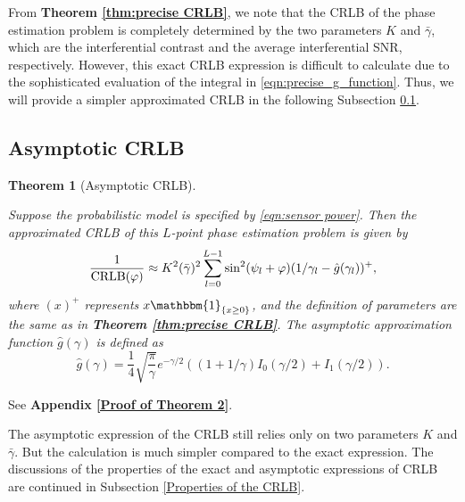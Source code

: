 \documentclass[journal,twocolumn]{IEEEtran}
\newtheorem{theorem}{\bf Theorem}
\theoremstyle{nonumberplain}
\begin{document}
    From \textbf{Theorem \ref{thm:precise CRLB}}, we note that the CRLB of the phase estimation problem is completely determined by the two parameters $K$ and $\bar{\gamma}$, which are the interferential contrast and the average interferential SNR, respectively. 
    However, this exact CRLB expression is difficult to calculate due to the sophisticated evaluation of the integral in \eqref{eqn:precise_g_function}.
    Thus, we will provide a simpler approximated CRLB in the following Subsection \ref{Asymptotic CRLB}.
    
\subsection{Asymptotic CRLB}    \label{Asymptotic CRLB}
    \begin{theorem}[Asymptotic CRLB] \label{thm:asymptotic CRLB} \mbox{}\par
        Suppose the probabilistic model is specified by \eqref{eqn:sensor power}. Then the approximated CRLB of this $L$-point phase estimation problem is given by 
        \begin{equation}
            \frac{1}{{\rm CRLB}(\varphi)}\approx K^2(\bar{\gamma})^2 \sum_{l=0}^{L-1}\sin^2(\psi_l+\varphi)(1/\gamma_l-\hat{g}(\gamma_l))^{+},
            \label{eqn:asymptotic CRLB}
        \end{equation}
        where $(x)^{+}$ represents ${x{\mathbbm{1}}_{\{x\geq 0\}}}$, and the definition of parameters are the same as in {\bf Theorem \ref{thm:precise CRLB}}. The asymptotic approximation function $\hat{g}(\gamma)$ is defined as 
        \begin{equation}
            \hat{g}(\gamma) = \frac{1}{4} \sqrt{\frac{\pi}{\gamma}}e^{-\gamma/2}\left((1+1/\gamma)I_0(\gamma/2) + I_1(\gamma/2)\right).
            \label{eqn:definition g function}
        \end{equation}
    \end{theorem}
    \begin{IEEEproof}
        See {\bf Appendix \ref{Proof of Theorem 2}}. 
    \end{IEEEproof}
    
        The asymptotic expression of the CRLB still relies only on two parameters $K$ and $\bar{\gamma}$. But the calculation is much simpler compared to the exact expression. 
        The discussions of the properties of the exact and asymptotic expressions of CRLB are continued in Subsection \ref{Properties of the CRLB}.
        
\end{document}
